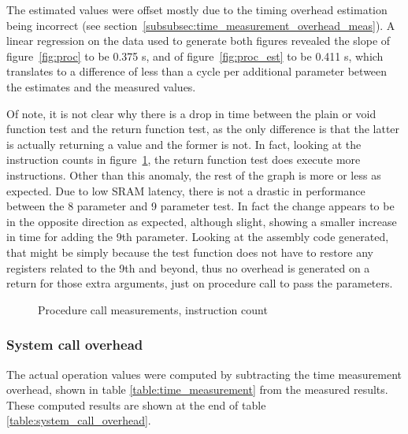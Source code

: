 \documentclass{article}
\begin{document}
The estimated values were offset mostly due to the timing overhead estimation being incorrect (see section~\ref{subsubsec:time_measurement_overhead_meas}). A linear regression on the data used to generate both figures revealed the slope of figure~\ref{fig:proc} to be 0.375 \textmu s, and of figure~\ref{fig:proc_est} to be 0.411 \textmu s, which translates to a difference of less than a cycle per additional parameter between the estimates and the measured values.

Of note, it is not clear why there is a drop in time between the plain or void function test and the return function test, as the only difference is that the latter is actually returning a value and the former is not. In fact, looking at the instruction counts in figure~\ref{fig:proc_inst}, the return function test does execute more instructions. Other than this anomaly, the rest of the graph is more or less as expected. Due to low SRAM latency, there is not a drastic in performance between the 8 parameter and 9 parameter test. In fact the change appears to be in the opposite direction as expected, although slight, showing a smaller increase in time for adding the 9th parameter. Looking at the assembly code generated, that might be simply because the test function does not have to restore any registers related to the 9th and beyond, thus no overhead is generated on a return for those extra arguments, just on procedure call to pass the parameters.

\begin{figure}[htp]
    \centering
        
        \caption{Procedure call measurements, instruction count}
        \label{fig:proc_inst}
\end{figure}

\subsubsection{System call overhead} \label{subsubsec:system_call_overhead}


The actual operation values were computed by subtracting the time measurement overhead, shown in table \ref{table:time_measurement} from the measured results. These computed results are shown at the end of table \ref{table:system_call_overhead}.
\end{document}
